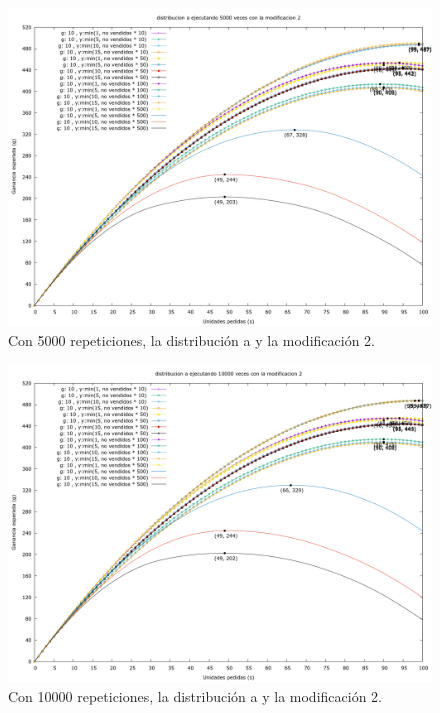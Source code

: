 \documentclass[12pt, spanish]{article}
\begin{document}
\begin{figure}[H]
	\centering
	\includegraphics[scale = 0.3]{prob_a/datos_a_5000_2.png}
	\caption{Con 5000 repeticiones, la distribución a y la modificación 2.}
	\label{fig:ej1_a_5000}

\end{figure}


\begin{figure}[H]
	\centering
	\includegraphics[scale = 0.3]{prob_a/datos_a_10000_2.png}
	\caption{Con 10000 repeticiones, la distribución a y la modificación 2.}
	\label{fig:ej1_a_10000}

\end{figure}
\end{document}
